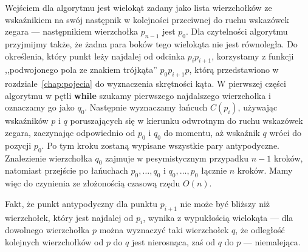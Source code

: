 Wejściem dla algorytmu jest wielokąt zadany jako lista wierzchołków ze
wskaźnikiem na swój następnik w kolejności przeciwnej do ruchu
wskazówek zegara --- następnikiem wierzchołka $p_{n-1}$ jest
$p_0$. Dla czytelności algorytmu przyjmijmy także, że żadna para boków
tego wielokąta nie jest równoległa. Do określenia, który punkt leży
najdalej od odcinka $p_{i}p_{i+1}$, korzystamy z funkcji ,,podwojonego
pola ze znakiem trójkąta'' $p_{0}p_{i+1}p$, którą przedstawiono w
rozdziale~\ref{chap:pojecia} do wyznaczenia skrętności kąta. W
pierwszej części algorytmu w pętli \textbf{while} szukamy pierwszego
najdalszego wierzchołka i oznaczamy go jako $q_0$. Następnie
wyznaczamy łańcuch $C(p_i)$, używając wskaźników $p$ i $q$
poruszających się w kierunku odwrotnym do ruchu wskazówek zegara,
zaczynając odpowiednio od $p_0$ i $q_0$ do momentu, aż wskaźnik $q$
wróci do pozycji $p_0$. Po tym kroku zostaną wypisane wszystkie pary
antypodyczne. Znalezienie wierzchołka $q_0$ zajmuje w pesymistycznym
przypadku $n-1$ kroków, natomiast przejście po łańuchach $p_{0},
\ldots, q_{0}$ i $q_{0}, \ldots, p_{0}$ łącznie $n$ kroków. Mamy więc
do czynienia ze złożonością czasową rzędu $O(n)$.



Fakt, że punkt antypodyczny dla punktu $p_{i+1}$ nie może być bliższy
niż wierzchołek, który jest najdalej od $p_i$, wynika z wypukłością
wielokąta --- dla dowolnego wierzchołka $p$ można wyznaczyć taki
wierzchołek $q$, że odległość kolejnych wierzchołków od $p$ do $q$
jest nierosnąca, zaś od $q$ do $p$ --- niemalejąca.

